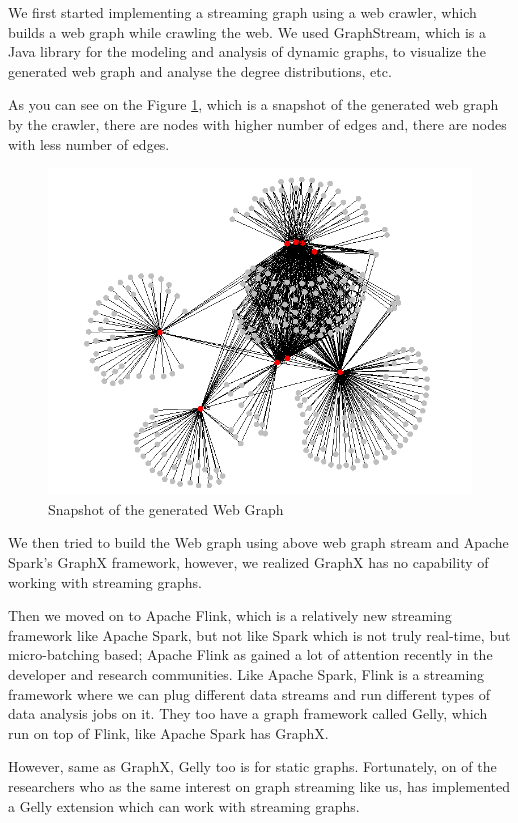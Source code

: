 \documentclass[12pt]{article}
\begin{document}
We first started implementing a streaming graph using a web crawler, which builds a web graph while crawling the web. We used  GraphStream, which is a Java library for the modeling and analysis of dynamic graphs, to visualize the generated web graph and analyse the degree distributions, etc. 

As you can see on the Figure \ref{fig:web-graph}, which is a snapshot of the generated web graph by the crawler, there are nodes with higher number of edges and, there are nodes with less number of edges.

\begin{figure}
\centering
\includegraphics[scale=0.5]{web-graph.png}
\caption{Snapshot of the generated Web Graph}
\label{fig:web-graph}
\end{figure}

We then tried to build the Web graph using above web graph stream and Apache Spark's GraphX framework, however, we realized GraphX has no capability of working with streaming graphs. 

Then we moved on to Apache Flink, which is a relatively new streaming framework like Apache Spark, but not like Spark which is not truly real-time, but micro-batching based; Apache Flink as gained a lot of attention recently in the developer and research communities. Like Apache Spark, Flink is a streaming framework where we can plug different data streams and run different types of data analysis jobs on it. They too have a graph framework called Gelly, which run on top of Flink, like Apache Spark has GraphX.

However, same as GraphX, Gelly too is for static graphs. Fortunately, on of the researchers who as the same interest on graph streaming like us, has implemented a Gelly extension which can work with streaming graphs.
\end{document}
